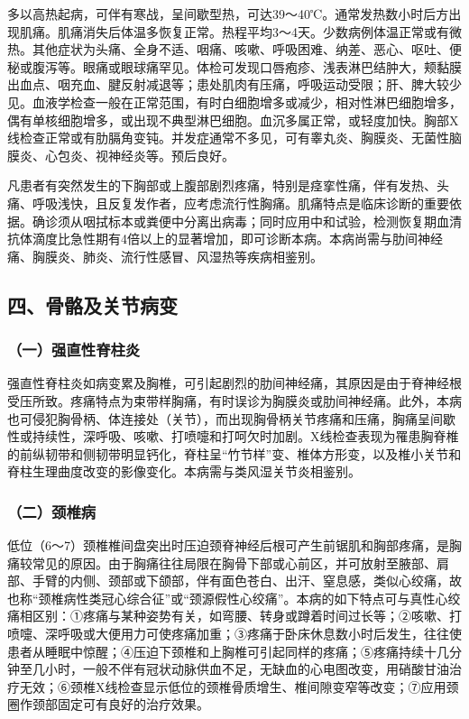 多以高热起病，可伴有寒战，呈间歇型热，可达39～40℃。通常发热数小时后方出现肌痛。肌痛消失后体温多恢复正常。热程平均3～4天。少数病例体温正常或有微热。其他症状为头痛、全身不适、咽痛、咳嗽、呼吸困难、纳差、恶心、呕吐、便秘或腹泻等。眼痛或眼球痛罕见。体检可发现口唇疱疹、浅表淋巴结肿大，颊黏膜出血点、咽充血、腱反射减退等；患处肌肉有压痛，呼吸运动受限；肝、脾大较少见。血液学检查一般在正常范围，有时白细胞增多或减少，相对性淋巴细胞增多，偶有单核细胞增多，或出现不典型淋巴细胞。血沉多属正常，或轻度加快。胸部X线检查正常或有肋膈角变钝。并发症通常不多见，可有睾丸炎、胸膜炎、无菌性脑膜炎、心包炎、视神经炎等。预后良好。

凡患者有突然发生的下胸部或上腹部剧烈疼痛，特别是痉挛性痛，伴有发热、头痛、呼吸浅快，且反复发作者，应考虑流行性胸痛。肌痛特点是临床诊断的重要依据。确诊须从咽拭标本或粪便中分离出病毒；同时应用中和试验，检测恢复期血清抗体滴度比急性期有4倍以上的显著增加，即可诊断本病。本病尚需与肋间神经痛、胸膜炎、肺炎、流行性感冒、风湿热等疾病相鉴别。

\subsection{四、骨骼及关节病变}

\subsubsection{（一）强直性脊柱炎}

强直性脊柱炎如病变累及胸椎，可引起剧烈的肋间神经痛，其原因是由于脊神经根受压所致。疼痛特点为束带样胸痛，有时误诊为胸膜炎或肋间神经痛。此外，本病也可侵犯胸骨柄、体连接处（关节），而出现胸骨柄关节疼痛和压痛，胸痛呈间歇性或持续性，深呼吸、咳嗽、打喷嚏和打呵欠时加剧。X线检查表现为罹患胸脊椎的前纵韧带和侧韧带明显钙化，脊柱呈“竹节样”变、椎体方形变，以及椎小关节和脊柱生理曲度改变的影像变化。本病需与类风湿关节炎相鉴别。

\subsubsection{（二）颈椎病}

低位（6～7）颈椎椎间盘突出时压迫颈脊神经后根可产生前锯肌和胸部疼痛，是胸痛较常见的原因。由于胸痛往往局限在胸骨下部或心前区，并可放射至腋部、肩部、手臂的内侧、颈部或下颌部，伴有面色苍白、出汗、窒息感，类似心绞痛，故也称“颈椎病性类冠心综合征”或“颈源假性心绞痛”。本病的如下特点可与真性心绞痛相区别：①疼痛与某种姿势有关，如弯腰、转身或蹲着时间过长等；②咳嗽、打喷嚏、深呼吸或大便用力可使疼痛加重；③疼痛于卧床休息数小时后发生，往往使患者从睡眠中惊醒；④压迫下颈椎和上胸椎可引起同样的疼痛；⑤疼痛持续十几分钟至几小时，一般不伴有冠状动脉供血不足，无缺血的心电图改变，用硝酸甘油治疗无效；⑥颈椎X线检查显示低位的颈椎骨质增生、椎间隙变窄等改变；⑦应用颈圈作颈部固定可有良好的治疗效果。

